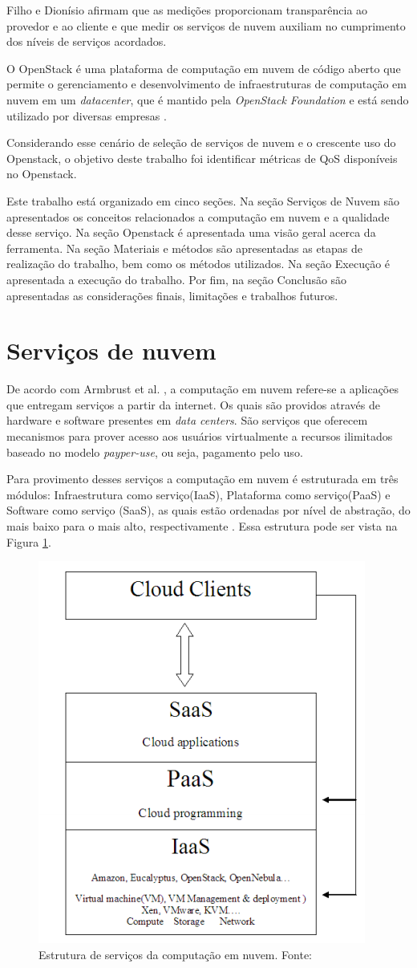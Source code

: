 \documentclass[conference]{IEEEtran}
\begin{document}
Filho e Dionísio \cite{leite2016influencia} afirmam que as medições proporcionam
transparência ao provedor e ao cliente e que medir os serviços de nuvem auxiliam no 
cumprimento dos níveis de serviços acordados.

O OpenStack \cite{openstack_general} é uma plataforma de computação em nuvem de código aberto que permite o gerenciamento e desenvolvimento 
de infraestruturas de computação em nuvem em um \textit{datacenter}, que é mantido pela 
\textit{OpenStack Foundation} e está sendo utilizado por diversas empresas \cite{openstack} \cite{bui2016}.

Considerando esse cenário de seleção de serviços de nuvem e o crescente uso do Openstack, o objetivo deste trabalho foi identificar
métricas de QoS disponíveis no Openstack.

Este trabalho está organizado em cinco seções. 
Na seção Serviços de Nuvem são apresentados os conceitos relacionados a computação em nuvem e a qualidade desse serviço. 
Na seção Openstack é apresentada uma visão geral acerca da ferramenta.
Na seção Materiais e métodos são apresentadas as etapas de realização do trabalho, bem como os métodos utilizados. 
Na seção Execução é apresentada a execução do trabalho.
Por fim, na seção Conclusão são apresentadas as considerações finais, limitações e trabalhos futuros.


\section{Serviços de nuvem}
De acordo com Armbrust et al. \cite{armbrust2010view}, a computação em nuvem refere-se a aplicações que entregam serviços a 
partir da internet. Os quais são providos através de hardware e software presentes em \textit{data centers}.
São serviços que oferecem mecanismos para prover acesso aos usuários virtualmente a recursos ilimitados baseado no 
modelo \textit{payper-use}, ou seja, pagamento pelo uso. \cite{sefraoui2012openstack}

Para provimento desses serviços a computação em nuvem é estruturada em três módulos: Infraestrutura como serviço(IaaS),
Plataforma como serviço(PaaS) e Software como serviço (SaaS), as quais estão ordenadas por nível de abstração, do mais baixo 
para o mais alto, respectivamente \cite{rehman2011teaching, sefraoui2012openstack, armbrust2010view, mell2011nist}. 
Essa estrutura pode ser vista na Figura \ref{fig:cloud_structure}.

\begin{figure}[ht]
\centering
\includegraphics[width=.3\textwidth]{figuras/cloud_structure.png}
\caption{Estrutura de serviços da computação em nuvem. Fonte: \cite{sefraoui2012openstack}}
\label{fig:cloud_structure}
\end{figure}
\end{document}
